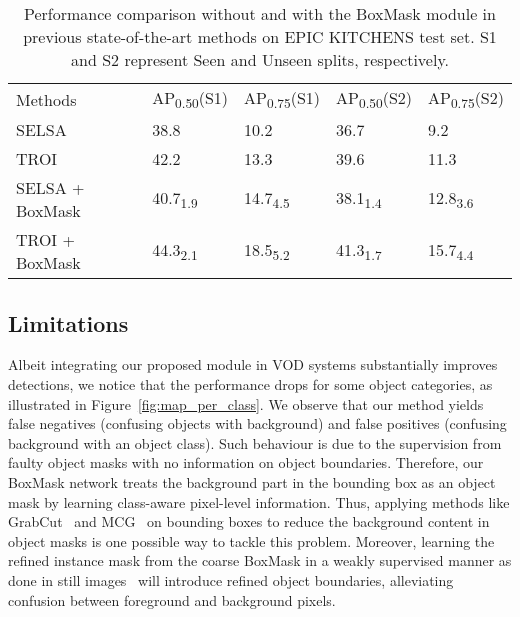 \documentclass[10pt,twocolumn,letterpaper]{article}
\begin{document}
\begin{table}
  \begin{center}
    {\footnotesize{
        \begin{tabular}{lll|ll}
        \toprule
        Methods & AP\textsubscript{0.50}(S1) & AP\textsubscript{0.75}(S1) &AP\textsubscript{0.50}(S2) & AP\textsubscript{0.75}(S2) \\
        \noalign{\smallskip}
        \hline
        \noalign{\smallskip}
        SELSA~\cite{wu2019sequence}  & 38.8  & 10.2 & 36.7 & 9.2 \\
        TROI~\cite{gong2021temporal}  & 42.2 & 13.3 & 39.6 & 11.3 \\
        \hline
        SELSA + BoxMask & 40.7\textsubscript{1.9} & 14.7\textsubscript{4.5} & 38.1\textsubscript{1.4} & 12.8\textsubscript{3.6} \\
        TROI + BoxMask & 44.3\textsubscript{2.1} & 18.5\textsubscript{5.2}& 41.3\textsubscript{1.7} & 15.7\textsubscript{4.4} \\
        \bottomrule
        \end{tabular}
        }}
    \end{center}
    \caption{Performance comparison without and with the BoxMask module in previous state-of-the-art methods on EPIC KITCHENS test set. S1 and S2 represent Seen and Unseen splits, respectively.}
\label{table:epic_kitchen_result}
\vspace{-10pt}
\end{table}


\subsection{Limitations}
Albeit integrating our proposed module in VOD systems substantially improves detections, we notice that the performance drops for some object categories, as illustrated in Figure~\ref{fig:map_per_class}\color{red}{(b)}\color{black}. We observe that our method yields false negatives (confusing objects with background) and false positives (confusing background with an object class). Such behaviour is due to the supervision from faulty object masks with no information on object boundaries. Therefore, our BoxMask network treats the background part in the bounding box as an object mask by learning class-aware pixel-level information. Thus, applying methods like GrabCut~\cite{rother2004grabcut} and MCG~\cite{arbelaez2014multiscale} on bounding boxes to reduce the background content in object masks is one possible way to tackle this problem. Moreover, learning the refined instance mask from the coarse BoxMask in a weakly supervised manner as done in still images~\cite{lan2021discobox, tian2021boxinst} will introduce refined object boundaries, alleviating confusion between foreground and background pixels.
\end{document}
